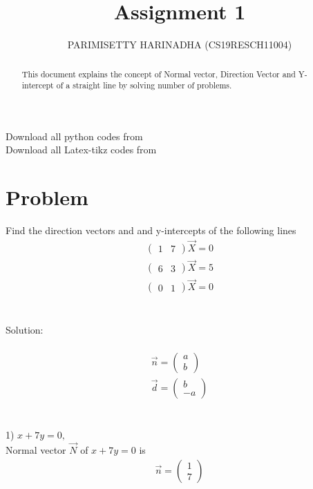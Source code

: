 \documentclass[journal,12pt,twocolumn]{IEEEtran}
\title{Assignment 1}
\author{PARIMISETTY HARINADHA (CS19RESCH11004)}
\newcommand{\myvec}[1]{\ensuremath{\begin{pmatrix}#1\end{pmatrix}}}
\begin{document}
\maketitle
\newpage
\begin{abstract}
This document explains the concept of Normal vector, Direction Vector and Y-intercept of a straight line by solving number of problems.
\end{abstract}
Download all python codes from 
 \\
\newline
Download all Latex-tikz codes from 

\section{Problem}
Find the direction vectors and and y-intercepts of the following lines \\
\begin{align} 
    		\myvec{ 1 & 7 } \vec{X} =  0
\end{align}
\begin{align} 
    		\myvec{ 6 & 3 } \vec{X} =  5
\end{align}
\begin{align} 
    		\myvec{ 0 & 1 } \vec{X} =  0
\end{align}
\\
\\
Solution:\\
\\
\begin{align}
	\vec{n} = \myvec{ a \\ b }\\
	\vec{d} = \myvec{ b \\ -a }
\end{align}
\\
\\
1) $ x  + 7y =  0,$
\\
Normal vector $\vec{N}$ of $ x  + 7y = 0 $ is   \begin{align}
	\vec{n} = \myvec{ 1 \\ 7 }
\end{align}
\\
	
\end{document}
